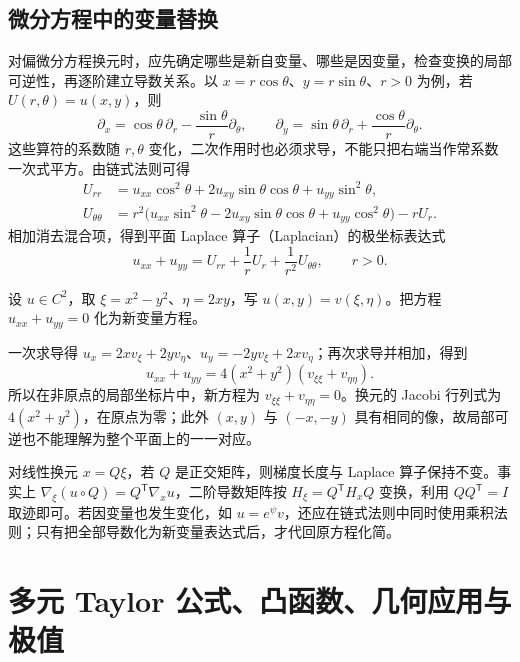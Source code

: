 \subsection{微分方程中的变量替换}

对偏微分方程换元时，应先确定哪些是新自变量、哪些是因变量，检查变换的局部可逆性，再逐阶建立导数关系。以 $x=r\cos\theta$、$y=r\sin\theta$、$r>0$ 为例，若 $U(r,\theta)=u(x,y)$，则
\[
\partial_x=\cos\theta\,\partial_r-\frac{\sin\theta}{r}\partial_\theta,\qquad
\partial_y=\sin\theta\,\partial_r+\frac{\cos\theta}{r}\partial_\theta.
\]
这些算符的系数随 $r,\theta$ 变化，二次作用时也必须求导，不能只把右端当作常系数一次式平方。由链式法则可得
\begin{align*}
U_{rr}&=u_{xx}\cos^2\theta+2u_{xy}\sin\theta\cos\theta+u_{yy}\sin^2\theta,\\
U_{\theta\theta}&=r^2\bigl(u_{xx}\sin^2\theta-2u_{xy}\sin\theta\cos\theta+u_{yy}\cos^2\theta\bigr)-rU_r.
\end{align*}
相加消去混合项，得到平面 Laplace 算子（Laplacian）的极坐标表达式
\begin{equation}
\label{eq:pei-polar-laplacian}
u_{xx}+u_{yy}=U_{rr}+\frac1rU_r+\frac1{r^2}U_{\theta\theta},\qquad r>0.
\end{equation}

\begin{example}
\label{ex:pei-quadratic-conformal-change}
设 $u\in C^2$，取 $\xi=x^2-y^2$、$\eta=2xy$，写 $u(x,y)=v(\xi,\eta)$。把方程 $u_{xx}+u_{yy}=0$ 化为新变量方程。
\end{example}
\begin{solve}
一次求导得 $u_x=2xv_\xi+2yv_\eta$、$u_y=-2yv_\xi+2xv_\eta$；再次求导并相加，得到
\[
u_{xx}+u_{yy}=4(x^2+y^2)(v_{\xi\xi}+v_{\eta\eta}).
\]
所以在非原点的局部坐标片中，新方程为 $v_{\xi\xi}+v_{\eta\eta}=0$。换元的 Jacobi 行列式为 $4(x^2+y^2)$，在原点为零；此外 $(x,y)$ 与 $(-x,-y)$ 具有相同的像，故局部可逆也不能理解为整个平面上的一一对应。
\end{solve}

对线性换元 $x=Q\xi$，若 $Q$ 是正交矩阵，则梯度长度与 Laplace 算子保持不变。事实上 $\nabla_\xi(u\circ Q)=Q^{\mathsf T}\nabla_xu$，二阶导数矩阵按 $H_\xi=Q^{\mathsf T}H_xQ$ 变换，利用 $QQ^{\mathsf T}=I$ 取迹即可。若因变量也发生变化，如 $u=e^\psi v$，还应在链式法则中同时使用乘积法则；只有把全部导数化为新变量表达式后，才代回原方程化简。

\section{多元 Taylor 公式、凸函数、几何应用与极值}
\label{sec:pei-taylor-convexity-extrema}


